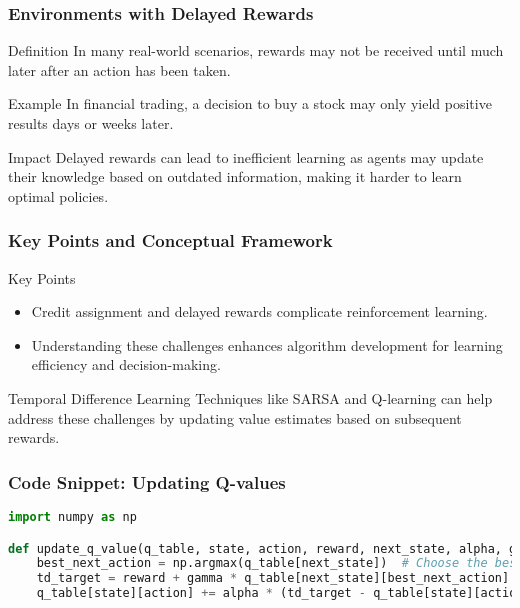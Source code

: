 \documentclass[aspectratio=169]{beamer}
\begin{document}
\begin{frame}
    \frametitle{Environments with Delayed Rewards}
    \begin{block}{Definition}
        In many real-world scenarios, rewards may not be received until much later after an action has been taken.
    \end{block}
    \begin{block}{Example}
        In financial trading, a decision to buy a stock may only yield positive results days or weeks later.
    \end{block}
    \begin{block}{Impact}
        Delayed rewards can lead to inefficient learning as agents may update their knowledge based on outdated information, making it harder to learn optimal policies.
    \end{block}
\end{frame}

\begin{frame}
    \frametitle{Key Points and Conceptual Framework}
    \begin{block}{Key Points}
        \begin{itemize}
            \item Credit assignment and delayed rewards complicate reinforcement learning.
            \item Understanding these challenges enhances algorithm development for learning efficiency and decision-making.
        \end{itemize}
    \end{block}
    
    \begin{block}{Temporal Difference Learning}
        Techniques like SARSA and Q-learning can help address these challenges by updating value estimates based on subsequent rewards.
    \end{block}
\end{frame}

\begin{frame}[fragile]
    \frametitle{Code Snippet: Updating Q-values}
    \begin{lstlisting}[language=Python]
import numpy as np

def update_q_value(q_table, state, action, reward, next_state, alpha, gamma):
    best_next_action = np.argmax(q_table[next_state])  # Choose the best action for the next state
    td_target = reward + gamma * q_table[next_state][best_next_action]  # Temporal difference target
    q_table[state][action] += alpha * (td_target - q_table[state][action])  # Update Q-value
    \end{lstlisting}
\end{frame}
\end{document}
